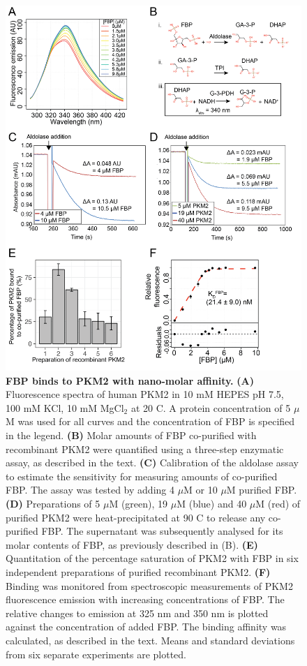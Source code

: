 \begin{figure}[!ht]
\includegraphics[scale=0.55]{ch4_fig1_fbp_binding.png}
\caption[FBP binds to PKM2 with nano-molar affinity.]{\textbf{FBP binds to PKM2 with nano-molar affinity.} \textbf{(A)} Fluorescence spectra of human PKM2 in 10 mM HEPES pH 7.5, 100 mM KCl, 10 mM MgCl$_2$ at 20 \textdegree C. A protein concentration of 5 $\mu$M was used for all curves and the concentration of FBP is specified in the legend. \textbf{(B)} Molar amounts of FBP co-purified with recombinant PKM2 were quantified using a three-step enzymatic assay, as described in the text. \textbf{(C)} Calibration of the aldolase assay to estimate the sensitivity for measuring amounts of co-purified FBP. The assay was tested by adding 4 $\mu$M or 10 $\mu$M purified FBP. \textbf{(D)} Preparations of 5 $\mu$M (green), 19 $\mu$M (blue) and 40 $\mu$M (red) of purified PKM2 were heat-precipitated at 90 \textdegree C to release any co-purified FBP. The supernatant was subsequently analysed for its molar contents of FBP, as previously described in (B). \textbf{(E)} Quantitation of the percentage saturation of PKM2 with FBP in six independent preparations of purified recombinant PKM2. \textbf{(F)} Binding was monitored from spectroscopic measurements of PKM2 fluorescence emission with increasing concentrations of FBP. The relative changes to emission at 325 nm and 350 nm is plotted against the concentration of added FBP. The binding affinity was calculated, as described in the text. Means and standard deviations from six separate experiments are plotted.}
\label{fig:fbp_binding_aldolase}
\end{figure}
%
%
\clearpage

